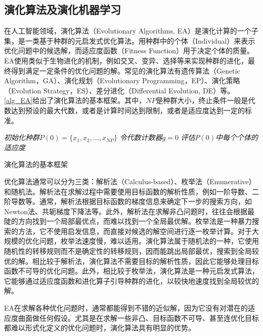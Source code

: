 \subsection{演化算法及演化机器学习}

在人工智能领域，演化算法（Evolutionary Algorithms, EA）\citep{back1996evolutionary}是演化计算的一个子集，是一类基于种群的元启发式优化算法。用种群中的个体（Individual）来表示优化问题中的候选解，而适应度函数（Fitness Function）用于决定个体的质量。EA使用类似于生物进化的机制，例如交叉、变异、选择等来实现种群的进化，最终得到满足一定条件的优化问题的解。常见的演化算法有遗传算法（Genetic Algorithm，GA）、演化规划（Evolutionary Programming，EP）、演化策略（Evolution Strategy，ES）、差分进化（Differential Evolution, DE）等。\autoref{alg_EA}给出了演化算法的基本框架。其中，\(NP\)是种群大小，终止条件一般是代数达到预设的最大代数，或者是计算时间达到限制，或者是适应度达到一定的标准。

\IncMargin{1em}
\begin{algorithm}
\emph{初始化种群$P(0) = \{x_{1},x_{2},\dots ,x_{NP}\}$}\;
\emph{令代数计数器$g = 0$}\;
\emph{评估$P(0)$中每个个体的适应度}\;
\caption{演化算法的基本框架}\label{alg_EA}
\end{algorithm}\DecMargin{1em}

优化算法通常可以分为三类：解析法（Calculus-based）、枚举法（Enumerative）和随机法\citep{潘正君1998演化计算}。解析法在求解过程中需要使用目标函数的解析性质，例如一阶导数、二阶导数等。通常，解析法根据目标函数的梯度信息来确定下一步的搜索方向，如Newton法、共轭梯度下降法等。此外，解析法在求解非凸问题时，往往会根据最陡的方向找到一个局部最优点，而难以找到一个全局最优解。枚举法是一种暴力搜索的方法，它不使用启发信息，而直接对候选的解空间进行逐一枚举计算。对于大规模的优化问题，枚举法速度慢，难以适用。演化算法属于随机法的一种，它使用随机性的转移规则而不是确定性的转移规则，因而能跳出局部最优，搜索到全局较优的解。相比较于解析法，演化算法不需要目标的解析性质，因此它能够处理目标函数不可导的优化问题。此外，相比较于枚举法，演化算法是一种元启发式算法，它能够通过适应度函数和进化算子引导种群的进化，以较快地速度找到全局较优的解。

EA在求解各种优化问题时，通常都能得到不错的近似解，因为它没有对潜在的适应度曲面做任何假设。尤其是在求解一些非凸、目标函数不可导、甚至连优化目标都难以形式化定义的优化问题时，演化算法具有明显的优势。

